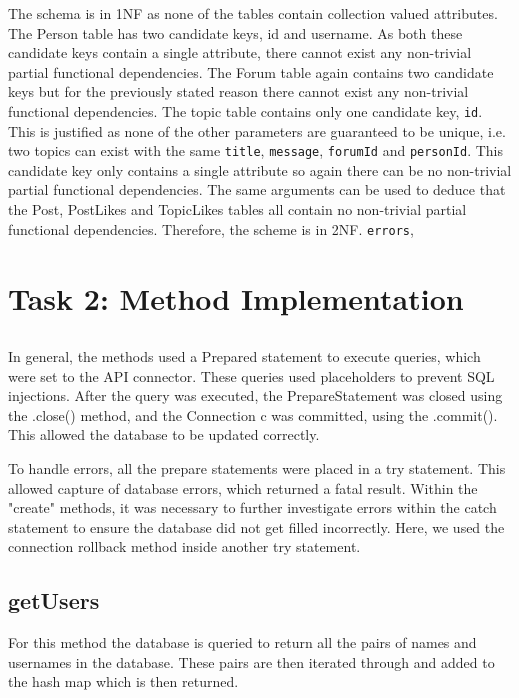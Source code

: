 \documentclass{article}
\begin{document}
The schema is in 1NF as none of the tables contain collection valued attributes. 
The Person table has two candidate keys, id and username. As both these candidate keys contain a single attribute, there cannot exist any non-trivial partial functional dependencies. The Forum table again contains two candidate keys but for the previously stated reason there cannot exist any non-trivial functional dependencies. The topic table contains only one candidate key, \texttt{id}. This is justified as none of the other parameters are guaranteed to be unique, i.e. two topics can exist with the same \texttt{title}, \texttt{message}, \texttt{forumId} and \texttt{personId}. This candidate key only contains a single attribute so again there can be no non-trivial partial functional dependencies. The same arguments can be used to deduce that the Post, PostLikes and TopicLikes tables all contain no non-trivial partial functional dependencies. Therefore, the scheme is in 2NF.
\texttt{errors},
\newpage
\section*{Task 2: Method Implementation}

\subsection*{}

In general, the methods used a Prepared statement to execute queries, which were set to the API connector. These queries used placeholders to prevent SQL injections. After the query was executed, the PrepareStatement was closed using the .close() method, and the Connection c was committed, using the .commit(). This allowed the database to be updated correctly.

To handle errors, all the prepare statements were placed in a try statement. This allowed capture of database errors, which returned a fatal result. Within the "create" methods, it was necessary to further investigate errors within the catch statement to ensure the database did not get filled incorrectly. Here, we used the connection rollback method inside another try statement.

\subsection*{getUsers}

For this method the database is queried to return all the pairs of names and usernames in the database. These pairs are then iterated through and added to the hash map which is then returned.
\end{document}
